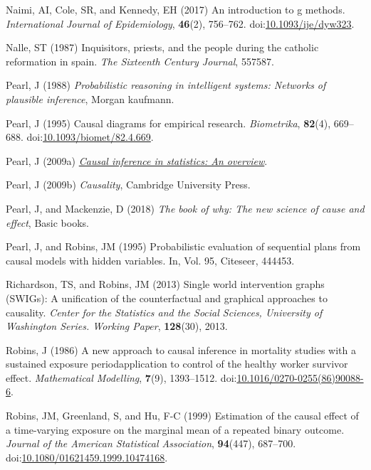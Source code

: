 \documentclass[
  singlecolumn,
  9pt]{article}
\newlength{\cslhangindent}
\newenvironment{CSLReferences}[2] %
 {\begin{list}{}{%
  \setlength{\itemindent}{0pt}
  \setlength{\leftmargin}{0pt}
  \setlength{\parsep}{0pt}
  \ifodd #1
   \setlength{\leftmargin}{\cslhangindent}
   \setlength{\itemindent}{-1\cslhangindent}
  \fi
  \setlength{\itemsep}{#2\baselineskip}}}
 {\end{list}}
\begin{document}
\begin{CSLReferences}{1}{0}
Naimi, AI, Cole, SR, and Kennedy, EH (2017) An introduction to g
methods. \emph{International Journal of Epidemiology}, \textbf{46}(2),
756--762.
doi:\href{https://doi.org/10.1093/ije/dyw323}{10.1093/ije/dyw323}.

Nalle, ST (1987) Inquisitors, priests, and the people during the
catholic reformation in spain. \emph{The Sixteenth Century Journal},
557587.

Pearl, J (1988) \emph{Probabilistic reasoning in intelligent systems:
Networks of plausible inference}, Morgan kaufmann.

Pearl, J (1995) Causal diagrams for empirical research.
\emph{Biometrika}, \textbf{82}(4), 669--688.
doi:\href{https://doi.org/10.1093/biomet/82.4.669}{10.1093/biomet/82.4.669}.

Pearl, J (2009a) \emph{\href{https://doi.org/10.1214/09-SS057}{Causal
inference in statistics: An overview}}.

Pearl, J (2009b) \emph{Causality}, Cambridge University Press.

Pearl, J, and Mackenzie, D (2018) \emph{The book of why: The new science
of cause and effect}, Basic books.

Pearl, J, and Robins, JM (1995) Probabilistic evaluation of sequential
plans from causal models with hidden variables. In, Vol. 95, Citeseer,
444453.

Richardson, TS, and Robins, JM (2013) Single world intervention graphs
(SWIGs): A unification of the counterfactual and graphical approaches to
causality. \emph{Center for the Statistics and the Social Sciences,
University of Washington Series. Working Paper}, \textbf{128}(30), 2013.

Robins, J (1986) A new approach to causal inference in mortality studies
with a sustained exposure period{\textemdash}application to control of
the healthy worker survivor effect. \emph{Mathematical Modelling},
\textbf{7}(9), 1393--1512.
doi:\href{https://doi.org/10.1016/0270-0255(86)90088-6}{10.1016/0270-0255(86)90088-6}.

Robins, JM, Greenland, S, and Hu, F-C (1999) Estimation of the causal
effect of a time-varying exposure on the marginal mean of a repeated
binary outcome. \emph{Journal of the American Statistical Association},
\textbf{94}(447), 687--700.
doi:\href{https://doi.org/10.1080/01621459.1999.10474168}{10.1080/01621459.1999.10474168}.


\end{CSLReferences}
\end{document}
